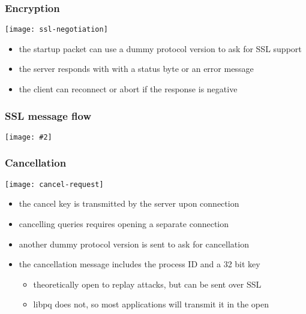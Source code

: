 \documentclass{beamer}
\newcommand{\mscdiagram}[2][1]{
  \begin{center}
    \texttt{[image: \#2]}
  \end{center}
}
\begin{document}
\begin{frame}
  \frametitle{Encryption}

  \begin{center}
    \texttt{[image: ssl-negotiation]}
  \end{center}

  \begin{itemize}
  \item the startup packet can use a dummy protocol version to ask for SSL
    support
  \item the server responds with with a status byte or an error message
  \item the client can reconnect or abort if the response is negative
  \end{itemize}

\end{frame}

\begin{frame}
  \frametitle{SSL message flow}

  \mscdiagram{ssl-message-flow}
\end{frame}

\begin{frame}
  \frametitle{Cancellation}

  \begin{center}
    \texttt{[image: cancel-request]}
  \end{center}

  \begin{itemize}
  \item the cancel key is transmitted by the server upon connection
  \item cancelling queries requires opening a separate connection
  \item another dummy protocol version is sent to ask for cancellation
  \item the cancellation message includes the process ID and a 32 bit key
    \begin{itemize}
    \item theoretically open to replay attacks, but can be sent over SSL
    \item libpq does not, so most applications will transmit it in the open
    \end{itemize}
  \end{itemize}
\end{frame}
\end{document}
